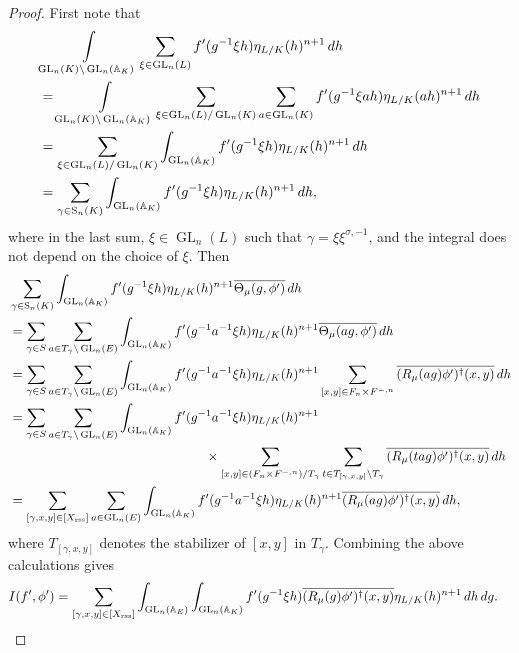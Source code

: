\documentclass[11pt, reqno]{amsart}
\numberwithin{equation}{subsection}
\theoremstyle{plain}
\theoremstyle{definition}
\newcommand{\bs}{\backslash}
\renewcommand{\AA}{\mathbb A}
\newcommand{\ol}{\overline}
\renewcommand{\S}{\textnormal{S}}
\DeclareMathOperator{\GL}{GL}
\newcommand{\rss}{\textnormal{rss}}
\begin{document}
\begin{proof}
First note that
\begin{align*}
    &\int\limits_{\GL_n(K) \bs \GL_n(\AA_K)}
    \sum_{\xi \in \GL_n(L)}
    f'(g^{-1}\xi h) \eta_{L/K}(h)^{n+1}\,dh\\ 
    &= \int\limits_{\GL_n(K)\bs \GL_n(\AA_K)}
    \sum_{\xi \in \GL_n(L)/\GL_n(K)}
    \sum_{a \in \GL_n(K)} f'(g^{-1}\xi a h)
    \eta_{L/K}(ah)^{n+1}\, dh \\
    &= \sum_{\xi \in \GL_n(L)/\GL_n(K)}
    \int_{\GL_n(\AA_K)} f'(g^{-1}\xi h)\eta_{L/K}(h)^{n+1}\, dh\\
    &= \sum_{\gamma \in \S_n(K)}
    \int_{\GL_n(\AA_K)} f'(g^{-1}\xi h)\eta_{L/K}(h)^{n+1}\, dh,
\end{align*}
where in the last sum, $\xi \in \GL_n(L)$ such that $\gamma = \xi\xi^{\sigma, -1}$,
and the integral does not depend on the choice of
$\xi$.
Then
\begin{align*}
    &\sum_{\gamma \in \S_n(K)}
    \int_{\GL_n(\AA_K)} f'(g^{-1}\xi h)\eta_{L/K}(h)^{n+1}
    \ol{\Theta_\mu(g, \phi')} \, dh \\
    &= \sum_{\gamma \in S} \sum_{a \in T_\gamma \bs \GL_n(E)}
    \int_{\GL_n(\AA_K)}
    f'(g^{-1}a^{-1}\xi h) \eta_{L/K}(h)^{n+1}
    \ol{\Theta_\mu(ag, \phi')} \, dh\\
    &= \sum_{\gamma \in S} \sum_{a \in T_\gamma\bs \GL_n(E)}
    \int_{\GL_n(\AA_K)}
    f'(g^{-1}a^{-1}\xi h)\eta_{L/K}(h)^{n+1}\sum_{[x, y] \in F_n \times F^{-,n}}
    \ol{(R_\mu(ag)\phi')^\dagger(x, y)} \, dh\\
    &= \sum_{\gamma \in S} \sum_{a \in T_\gamma \bs \GL_n(E)}
    \int_{\GL_n(\AA_K)} f'(g^{-1}a^{-1}\xi h)
    \eta_{L/K}(h)^{n+1}\\
    &\hspace{15em}\times \sum_{[x, y] \in (F_n \times F^{-,n})/T_\gamma} 
    \sum_{t \in T_{[\gamma, x, y]} \bs T_\gamma}
    \ol{(R_\mu(tag)\phi')^\dagger(x, y)}\, dh \\
    &= \sum_{[\gamma, x, y] \in [X_\rss]}
    \sum_{a \in \GL_n(E)} 
    \int_{\GL_n(\AA_K)}
    f'(g^{-1}a^{-1}\xi h) \eta_{L/K}(h)^{n+1}
    \ol{(R_\mu(ag)\phi')^\dagger(x, y)}\, dh,
\end{align*}
where $T_{[\gamma, x, y]}$ denotes the
stabilizer of $[x, y]$ in $T_\gamma$.
Combining the above calculations gives
\begin{align*}
    I(f', \phi') &= 
    \sum_{[\gamma, x, y] \in [X_\rss]}
    \int_{\GL_n(\AA_E)}
    \int_{\GL_n(\AA_K)} 
    f'(g^{-1}\xi h) \ol{(R_\mu(g)\phi')^\dagger(x, y)}\eta_{L/K}(h)^{n+1}\,dh\, dg. \qedhere
\end{align*}
\end{proof}
\end{document}
